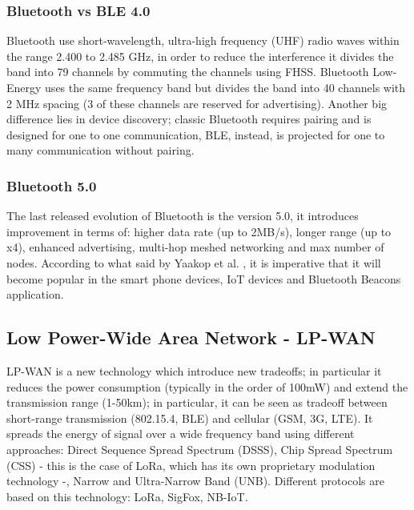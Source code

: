 \documentclass[sigconf]{acmart}
\begin{document}
	\subsubsection{Bluetooth vs BLE 4.0}
	Bluetooth use short-wavelength, ultra-high frequency (UHF) radio waves within the range 2.400 to 2.485 GHz, in order to reduce the interference it divides the band into 79 channels by commuting the channels using FHSS. Bluetooth Low-Energy uses the same frequency band but divides the band into 40 channels with 2 MHz spacing (3 of these channels are reserved for advertising). Another big difference lies in device discovery; classic Bluetooth requires pairing and is designed for one to one communication, BLE, instead, is projected for one to many communication without pairing.
     \subsubsection{Bluetooth 5.0}
     The last released evolution of Bluetooth is the version 5.0, it introduces improvement in terms of: higher data rate (up to 2MB/s), longer range (up to x4), enhanced advertising, multi-hop meshed networking and max number of nodes. According to what said by Yaakop et al. \cite{yaakop}, it is imperative that it will become popular in the smart phone devices, IoT devices and Bluetooth Beacons application.
      \subsection{Low Power-Wide Area Network - LP-WAN}
      LP-WAN is a new technology which introduce new tradeoffs; in particular it reduces the power consumption (typically in the order of 100mW) and extend the transmission range (1-50km); in particular, it can be seen as tradeoff between short-range transmission (802.15.4, BLE) and cellular (GSM, 3G, LTE). It spreads the energy of signal over a wide frequency band using different approaches: Direct Sequence Spread Spectrum (DSSS), Chip Spread Spectrum (CSS) - this is the case of LoRa\textup\textregistered, which has its own proprietary modulation technology -, Narrow and Ultra-Narrow Band (UNB). Different protocols are based on this technology: LoRa\textup{\textregistered}, SigFox, NB-IoT.
\end{document}

